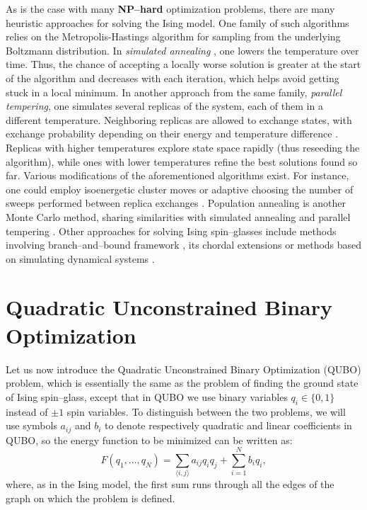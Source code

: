 As is the case with many \textbf{NP--hard} optimization problems, there are
many heuristic approaches for solving the Ising model. One family of such
algorithms relies on the Metropolis-Hastings \cite{beichl} algorithm for
sampling from the underlying Boltzmann distribution. In \emph{simulated
  annealing} \cite{cook, isakov}, one lowers the temperature over time. Thus, the
chance of accepting a locally worse solution is greater at the start of the
algorithm and decreases with each iteration, which helps avoid getting stuck in
a local minimum. In another approach from the same family, \emph{parallel
  tempering}, one simulates several replicas of the system, each of them in a
different temperature. Neighboring replicas are allowed to exchange states,
with exchange probability depending on their energy and temperature difference
\cite{swendsen}. Replicas with higher temperatures explore state space rapidly
(thus reseeding the algorithm), while ones with lower temperatures refine the
best solutions found so far. Various modifications of the aforementioned
algorithms exist. For instance, one could employ isoenergetic cluster moves
\cite{zhu} or adaptive choosing the number of sweeps performed between replica
exchanges \cite{bittner}. Population annealing is another Monte Carlo method,
sharing similarities with simulated annealing and parallel tempering
\cite{wang}. Other approaches for solving Ising spin--glasses include methods
involving branch--and--bound framework \cite{rendl}, its chordal extensions
\cite{baccari} or methods based on simulating dynamical systems \cite{sheldon}.

\section{Quadratic Unconstrained Binary Optimization}

Let us now introduce the Quadratic Unconstrained Binary Optimization (QUBO)
problem, which is essentially the same as the problem of finding the ground
state of Ising spin--glass, except that in QUBO we use binary variables $q_{i}
  \in \{0, 1\}$ instead of $\pm 1$ spin variables. To distinguish between the two
    problems, we will use symbols $a_{ij}$ and $b_{i}$ to denote respectively
    quadratic and linear coefficients in QUBO, so the energy function to be
    minimized can be written as:
    \begin{equation}
      \label{eq:qubo}
      F(q_1, \ldots, q_N) =  \sum_{\langle i, j \rangle} a_{ij} q_i q_j + \sum_{i=1}^N b_iq_i,
    \end{equation}
    where, as in the Ising model, the first sum runs through all the edges of the
    graph on which the problem is defined.

